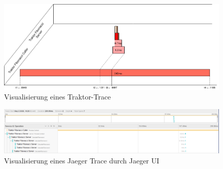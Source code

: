 \begin{figure}[!ht]
	\centering
	\includegraphics[scale=0.4]{img/Evaluation/Eval_TraktorEnv.png}
	\caption[Visualisierung eines Traktor-Trace]{Visualisierung eines Traktor-Trace}
	\label{fig:Eval_TraktorEnv}
\end{figure}


\begin{landscape}
	\begin{figure}
		\hspace*{-130pt}
		\includegraphics[scale=0.55]{img/Evaluation/Trace_Dist.png}
		\caption[Visualisierung eines Jaeger Trace durch Jaeger UI]{Visualisierung eines Jaeger Trace durch Jaeger UI}
		\label{fig:Trace_Dist}
	\end{figure}
\end{landscape}

